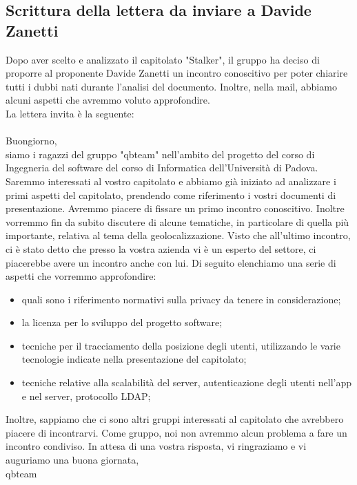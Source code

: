 \subsection{Scrittura della lettera da inviare a Davide Zanetti}
Dopo aver scelto e analizzato il capitolato "Stalker", il gruppo ha deciso di proporre al proponente Davide Zanetti un incontro conoscitivo per poter chiarire tutti i dubbi nati durante l'analisi del documento. Inoltre, nella mail, abbiamo alcuni aspetti che avremmo voluto approfondire.
\\La lettera invita è la seguente:
\\\\Buongiorno,
\\siamo i ragazzi del gruppo "qbteam" nell'ambito del progetto del corso di Ingegneria del software del corso di Informatica dell'Università di Padova. Saremmo interessati al vostro capitolato e abbiamo già iniziato ad analizzare i primi aspetti del capitolato, prendendo come riferimento i vostri documenti di presentazione. Avremmo piacere di fissare un primo incontro conoscitivo. Inoltre vorremmo fin da subito discutere di alcune tematiche, in particolare di quella più importante, relativa al tema della geolocalizzazione. Visto che all'ultimo incontro, ci è stato detto che presso la vostra azienda vi è un esperto del settore, ci piacerebbe avere un incontro anche con lui. Di seguito elenchiamo una serie di aspetti che vorremmo approfondire:
\begin{itemize}
	\item quali sono i riferimento normativi sulla privacy da tenere in considerazione;
	\item  la licenza per lo sviluppo del progetto software;
	\item tecniche per il tracciamento della posizione degli utenti, utilizzando le varie tecnologie indicate nella presentazione del capitolato;
	\item tecniche relative alla scalabilità del server, autenticazione degli utenti nell'app e nel server, protocollo LDAP;
\end{itemize}
Inoltre, sappiamo che ci sono altri gruppi interessati al capitolato che avrebbero piacere di incontrarvi. Come gruppo, noi non avremmo alcun problema a fare un incontro condiviso.
In attesa di una vostra risposta, vi ringraziamo e vi auguriamo una buona giornata,
\\qbteam

